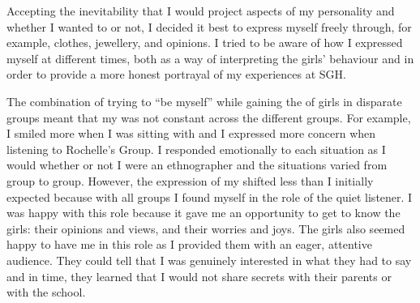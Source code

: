 Accepting the inevitability that I would project aspects of my personality and  whether I wanted to or not, I decided it best to express myself freely through, for example, clothes, jewellery, and opinions. I tried to be aware of how I expressed myself at different times, both as a way of interpreting the girls' behaviour and in order to provide a more honest portrayal of my experiences at SGH. 

The combination of trying to ``be myself'' while gaining the  of girls in disparate groups meant that my  was not constant across the different groups. For example, I smiled more when I was sitting with  and I expressed more concern when listening to Rochelle's Group. I responded emotionally to each situation as I would whether or not I were an ethnographer and the situations varied from group to group. However, the expression of my  shifted less than I initially expected because with all groups I found myself in the role of the quiet listener. I was happy with this role because it gave me an opportunity to get to know the girls: their opinions and views, and their worries and joys. The girls also seemed happy to have me in this role as I provided them with an eager, attentive audience. They could tell that I was genuinely interested in what they had to say and in time, they learned that I would not share secrets with their parents or with the school.

